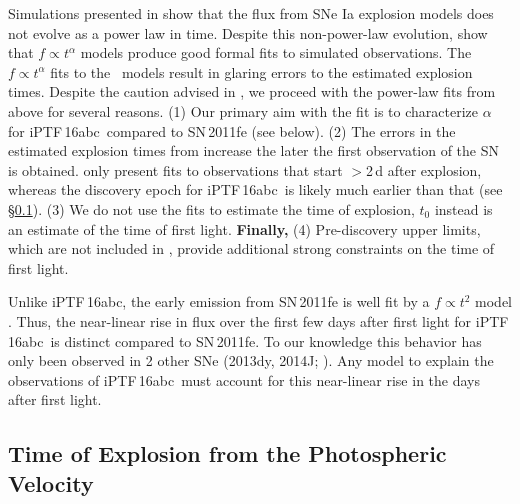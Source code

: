 \documentclass[twocolumn]{aastex61}
\newcommand{\abc}{iPTF\,16abc}
\begin{document}
Simulations presented in \citet{2017MNRAS.472.2787N} show that the flux from
SNe Ia explosion models does not evolve as a power law in time. Despite this
non-power-law evolution, \citet{2017MNRAS.472.2787N} show that $f \propto
t^\alpha$ models produce good formal fits to simulated observations. The $f
\propto t^\alpha$ fits to the \citeauthor{2017MNRAS.472.2787N}\ models result
in glaring errors to the estimated explosion times. Despite the caution
advised in \citet{2017MNRAS.472.2787N}, we proceed with the power-law fits
from above for several reasons. (1) Our primary aim with the fit is to
characterize $\alpha$ for \abc\ compared to SN\,2011fe (see below). (2) The
errors in the estimated explosion times from \citeauthor{2017MNRAS.472.2787N}
increase the later the first observation of the SN is obtained.
\citeauthor{2017MNRAS.472.2787N} only present fits to observations that start
$>$2\,d after explosion, whereas the discovery epoch for \abc\ is likely much
earlier than that (see \S\ref{sec:early_vel}). (3) We do not use the fits to
estimate the time of explosion, $t_0$ instead is an estimate of the time of
first light. \textbf{Finally,} (4) Pre-discovery upper limits, which are not
included in \citeauthor{2017MNRAS.472.2787N}, provide additional strong
constraints on the time of first light.

Unlike \abc, the early emission from SN\,2011fe is well fit by a $f \propto
t^2$ model \citep{2011Natur.480..344N}. Thus, the near-linear rise in flux
over the first few days after first light for \abc\ is distinct compared to
SN\,2011fe. To our knowledge this behavior has only been observed in 2 other
SNe (2013dy, 2014J;
\citealt{2013ApJ...778L..15Z,2014ApJ...783L..24Z,2015ApJ...799..106G}). Any
model to explain the observations of \abc\ must account for this near-linear
rise in the days after first light.

\subsection{Time of Explosion from the Photospheric Velocity}
\label{sec:early_vel}
\end{document}
